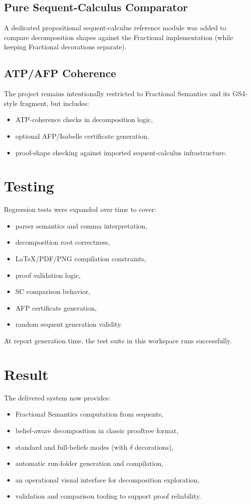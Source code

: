 \documentclass[11pt,a4paper]{article}
\begin{document}
\subsection{Pure Sequent-Calculus Comparator}
A dedicated propositional sequent-calculus reference module was added to compare decomposition shapes against the Fractional implementation (while keeping Fractional decorations separate).

\subsection{ATP/AFP Coherence}
The project remains intentionally restricted to Fractional Semantics and its GS4-style fragment, but includes:
\begin{itemize}[leftmargin=1.5em]
  \item ATP-coherence checks in decomposition logic,
  \item optional AFP/Isabelle certificate generation,
  \item proof-shape checking against imported sequent-calculus infrastructure.
\end{itemize}

\section{Testing}
Regression tests were expanded over time to cover:
\begin{itemize}[leftmargin=1.5em]
  \item parser semantics and comma interpretation,
  \item decomposition root correctness,
  \item LaTeX/PDF/PNG compilation constraints,
  \item proof validation logic,
  \item SC comparison behavior,
  \item AFP certificate generation,
  \item random sequent generation validity.
\end{itemize}

At report generation time, the test suite in this workspace runs successfully.

\section{Result}
The delivered system now provides:
\begin{itemize}[leftmargin=1.5em]
  \item Fractional Semantics computation from sequents,
  \item belief-aware decomposition in classic prooftree format,
  \item standard and full-beliefs modes (with $\delta$ decorations),
  \item automatic run-folder generation and compilation,
  \item an operational visual interface for decomposition exploration,
  \item validation and comparison tooling to support proof reliability.
\end{itemize}
\end{document}
